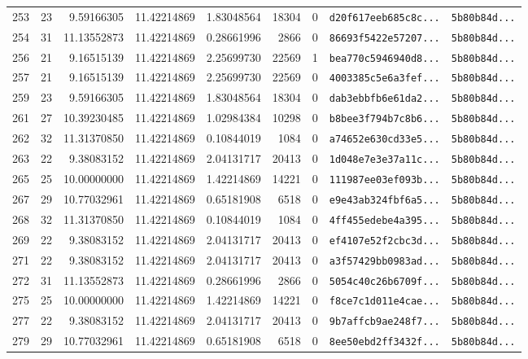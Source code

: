 \documentclass[10pt]{article}
\begin{document}
\begin{longtable}{rrrrrrrll}
  253 & 23 & 9.59166305 & 11.42214869 & 1.83048564 & 18304 & 0 & \texttt{d20f617eeb685c8c...} & \texttt{5b80b84d...} \\
  254 & 31 & 11.13552873 & 11.42214869 & 0.28661996 & 2866 & 0 & \texttt{86693f5422e57207...} & \texttt{5b80b84d...} \\
  \rowcolor{cmpink!20} 256 & 21 & 9.16515139 & 11.42214869 & 2.25699730 & 22569 & 1 & \texttt{bea770c5946940d8...} & \texttt{5b80b84d...} \\
  257 & 21 & 9.16515139 & 11.42214869 & 2.25699730 & 22569 & 0 & \texttt{4003385c5e6a3fef...} & \texttt{5b80b84d...} \\
  259 & 23 & 9.59166305 & 11.42214869 & 1.83048564 & 18304 & 0 & \texttt{dab3ebbfb6e61da2...} & \texttt{5b80b84d...} \\
  261 & 27 & 10.39230485 & 11.42214869 & 1.02984384 & 10298 & 0 & \texttt{b8bee3f794b7c8b6...} & \texttt{5b80b84d...} \\
  262 & 32 & 11.31370850 & 11.42214869 & 0.10844019 & 1084 & 0 & \texttt{a74652e630cd33e5...} & \texttt{5b80b84d...} \\
  263 & 22 & 9.38083152 & 11.42214869 & 2.04131717 & 20413 & 0 & \texttt{1d048e7e3e37a11c...} & \texttt{5b80b84d...} \\
  265 & 25 & 10.00000000 & 11.42214869 & 1.42214869 & 14221 & 0 & \texttt{111987ee03ef093b...} & \texttt{5b80b84d...} \\
  267 & 29 & 10.77032961 & 11.42214869 & 0.65181908 & 6518 & 0 & \texttt{e9e43ab324fbf6a5...} & \texttt{5b80b84d...} \\
  268 & 32 & 11.31370850 & 11.42214869 & 0.10844019 & 1084 & 0 & \texttt{4ff455edebe4a395...} & \texttt{5b80b84d...} \\
  269 & 22 & 9.38083152 & 11.42214869 & 2.04131717 & 20413 & 0 & \texttt{ef4107e52f2cbc3d...} & \texttt{5b80b84d...} \\
  271 & 22 & 9.38083152 & 11.42214869 & 2.04131717 & 20413 & 0 & \texttt{a3f57429bb0983ad...} & \texttt{5b80b84d...} \\
  272 & 31 & 11.13552873 & 11.42214869 & 0.28661996 & 2866 & 0 & \texttt{5054c40c26b6709f...} & \texttt{5b80b84d...} \\
  275 & 25 & 10.00000000 & 11.42214869 & 1.42214869 & 14221 & 0 & \texttt{f8ce7c1d011e4cae...} & \texttt{5b80b84d...} \\
  277 & 22 & 9.38083152 & 11.42214869 & 2.04131717 & 20413 & 0 & \texttt{9b7affcb9ae248f7...} & \texttt{5b80b84d...} \\
  279 & 29 & 10.77032961 & 11.42214869 & 0.65181908 & 6518 & 0 & \texttt{8ee50ebd2ff3432f...} & \texttt{5b80b84d...} \\

\end{longtable}
\end{document}
